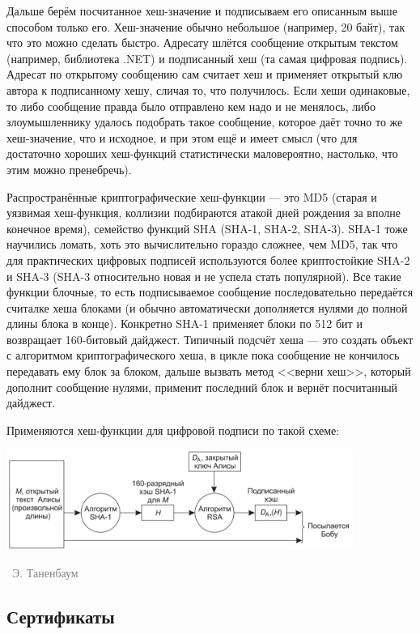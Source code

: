 \documentclass[a5paper]{article}
\newcommand{\attribution}[1] {
\vspace{-5mm}\begin{flushright}\begin{scriptsize}\textcolor{gray}{\textcopyright\, #1}\end{scriptsize}\end{flushright}
}
\begin{document}
Дальше берём посчитанное хеш-значение и подписываем его описанным выше способом только его. Хеш-значение обычно небольшое (например, 20 байт), так что это можно сделать быстро. Адресату шлётся сообщение открытым текстом (например, библиотека .NET) и подписанный хеш (та самая цифровая подпись). Адресат по открытому сообщению сам считает хеш и применяет открытый клю автора к подписанному хешу, сличая то, что получилось. Если хеши одинаковые, то либо сообщение правда было отправлено кем надо и не менялось, либо злоумышленнику удалось подобрать такое сообщение, которое даёт точно то же хеш-значение, что и исходное, и при этом ещё и имеет смысл (что для достаточно хороших хеш-функций статистически маловероятно, настолько, что этим можно пренебречь).

Распространённые криптографические хеш-функции --- это MD5 (старая и уязвимая хеш-функция, коллизии подбираются атакой дней рождения за вполне конечное время), семейство функций SHA (SHA-1, SHA-2, SHA-3). SHA-1 тоже научились ломать, хоть это вычислительно гораздо сложнее, чем MD5, так что для практических цифровых подписей используются более криптостойкие SHA-2 и SHA-3 (SHA-3 относительно новая и не успела стать популярной). Все такие функции блочные, то есть подписываемое сообщение последовательно передаётся считалке хеша блоками (и обычно автоматически дополняется нулями до полной длины блока в конце). Конкретно SHA-1 применяет блоки по 512 бит и возвращает 160-битовый дайджест. Типичный подсчёт хеша --- это создать объект с алгоритмом криптографического хеша, в цикле пока сообщение не кончилось передавать ему блок за блоком, дальше вызвать метод <<верни хеш>>, который дополнит сообщение нулями, применит последний блок и вернёт посчитанный дайджест.

Применяются хеш-функции для цифровой подписи по такой схеме:

\begin{center}
    \includegraphics[width=0.85\textwidth]{sha1Signature.png}
    \attribution{Э. Таненбаум}
\end{center}

\subsection{Сертификаты}
\end{document}
